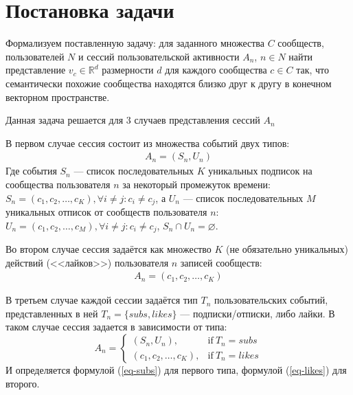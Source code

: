 \documentclass[times,specification,annotation]{itmo-student-thesis}
\begin{document}


\section{Постановка задачи}\label{sec:intro}

Формализуем поставленную задачу: для заданного множества $C$ сообществ, пользователей $N$ и сессий пользовательской активности $A_n$, $n \in N$ найти представление $v_{c} \in \mathbb{R}^d$ размерности $d$ для каждого сообщества $c \in C$ так, что семантически похожие сообщества находятся близко друг к другу в конечном векторном пространстве. 

Данная задача решается для 3 случаев представления сессий $A_n$
 
В первом случае сессия состоит из множества событий двух типов:
 \begin{align}
A_n = (S_n, U_n) 
\label{eq-subs}
\end{align}
Где события $S_n$ --- список последовательных $K$ уникальных подписок на сообщества пользователя $n$ за некоторый промежуток времени: $S_n = (c_{1}, c_{2}, \dots, c_{K}), \forall i \ne j : c_i \ne c_j$, а $U_n$ --- список последовательных $M$ уникальных отписок от сообществ пользователя $n$: $U_n = (c_{1},  c_{2}, \dots, c_{M}), \forall i \ne j : c_i \ne c_j$, $S_n \cap U_n = \varnothing$.

Во втором случае сессия задаётся как множество $K$ (не обязательно уникальных) действий (<<лайков>>) пользователя $n$ записей сообществ:
 \begin{align}
A_n = (c_{1}, c_{2}, \dots, c_{K}) 
\label{eq-likes}
\end{align}
 
В третьем случае каждой сессии задаётся тип $T_n$ пользовательских событий, представленных в ней $T_n = \{subs, likes\}$ --- подписки/отписки, либо лайки. В таком случае сессия задается в зависимости от типа:
\begin{equation}
    A_n =
    \begin{cases}
      (S_n, U_n), & \text{if}\ T_n=subs \\
      (c_{1}, c_{2}, \dots, c_{K}), & \text{if}\ T_n=likes
    \end{cases}  
    \label{eq-combined}
  \end{equation}
 И определяется формулой (\ref{eq-subs}) для первого типа, формулой (\ref{eq-likes}) для второго.
\end{document}
